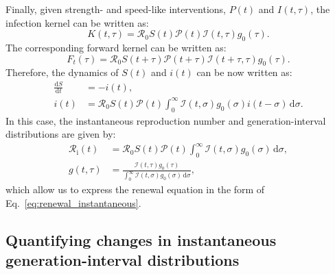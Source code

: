 \documentclass[12pt]{article}
\newcommand{\eref}[1]{Eq.~\ref{eq:#1}}
\newcommand{\Rx}[1]{\ensuremath{{\mathcal R}_{#1}}\xspace}
\newcommand{\Ro}{\Rx{0}}
\newcommand{\Ri}{\Rx{\mathrm{i}}}
\newcommand{\RR}{\ensuremath{{\mathcal R}}\xspace}
\newcommand{\dd}[1]{\ensuremath{\, \mathrm{d}#1}}
\newcommand{\dsigma}{\dd{\sigma}}
\newcommand{\PP}{{\mathcal P}}
\newcommand{\II}{{\mathcal I}}
\begin{document}
Finally, given strength- and speed-like interventions, $P(t)$ and $I(t, \tau)$, the infection kernel can be written as:
\begin{equation}
K(t, \tau) = \Ro S(t) \PP(t) \II(t,\tau) g_0(\tau).
\end{equation}
The corresponding forward kernel can be written as:
\begin{equation}
F_t(\tau) = \Ro S(t+\tau) \PP(t + \tau) \II(t+\tau, \tau) g_0(\tau).
\end{equation}
Therefore, the dynamics of $S(t)$ and $i(t)$ can be now written as:
\begin{align}
\frac{\mathrm{d}S}{\mathrm{d}t} &= - i(t),\\
i(t) &= \Ro S(t) \PP(t) \int_0^\infty \II(t, \sigma) g_0(\sigma) i(t-\sigma)\dsigma.
\end{align}
In this case, the instantaneous reproduction number and generation-interval distributions are given by:
\begin{align}
\Ri(t) &= \RR_0 S(t) \PP(t) \int_0^\infty \II(t,\sigma) g_0(\sigma) \dsigma,\\
g(t, \tau) &= \frac{\II(t,\tau) g_0(\tau)}{\int_0^\infty \II(t,\sigma) g_0(\sigma) \dsigma},
\end{align}
which allow us to express the renewal equation in the form of \eref{renewal_instantaneous}.


\subsection{Quantifying changes in instantaneous generation-interval distributions}
\end{document}
